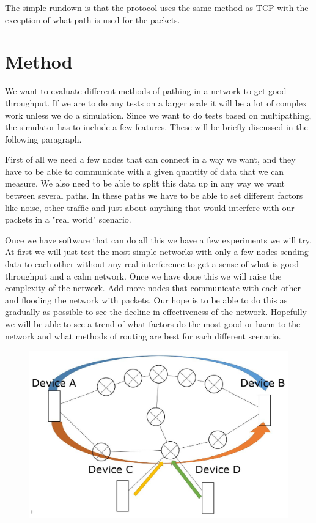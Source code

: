\documentclass[11pt,twocolumn]{article}
\begin{document}
The simple rundown is that the protocol uses the same method as TCP with the exception of what path is used for the packets. 

\section{Method}

We want to evaluate different methods of pathing in a network to get good throughput. If we are to do any tests on a larger scale it will be a lot of complex work unless we do a simulation. Since we want to do tests based on multipathing, the simulator has to include a few features. These will be briefly discussed in the following paragraph.

First of all we need a few nodes that can connect in a way we want, and they have to be able to communicate with a given quantity of data that we can measure. We also need to be able to split this data up in any way we want between several paths. In these paths we have to be able to set different factors like noise, other traffic and just about anything that would interfere with our packets in a "real world" scenario.

Once we have software that can do all this we have a few experiments we will try. At first we will just test the most simple networks with only a few nodes sending data to each other without any real interference to get a sense of what is good throughput and a calm network. Once we have done this we will raise the complexity of the network. Add more nodes that communicate with each other and flooding the network with packets. Our hope is to be able to do this as gradually as possible to see the decline in effectiveness of the network. Hopefully we will be able to see a trend of what factors do the most good or harm to the network and what methods of routing are best for each different scenario.
\begin{figure}[ht]
\begin{center}
\includegraphics[scale=0.26]{Figure_1}
\end{center}
\end{figure}
\end{document}
